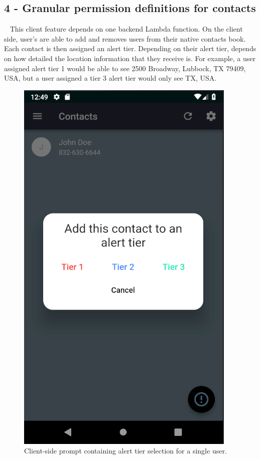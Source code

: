 \documentclass[10pt, a4paper]{article}
\begin{document}
\subsection{4 - Granular permission definitions for contacts}
\par ~ This client feature depends on one backend Lambda function. On the client side, user's are able to add and removes users from their native contacts book. Each contact is then assigned an alert tier. Depending on their alert tier, depends on how detailed the location information that they receive is. For example, a user assigned alert tier 1 would be able to see  2500 Broadway, Lubbock, TX 79409, USA, but a user assigned a tier 3 alert tier would only see TX, USA.

\begin{figure}[H]
  \centerline{
  	\includegraphics[scale=.8]{img/alert-tier.PNG}
  }  
  \caption{Client-side prompt containing alert tier selection for a single user.}
\end{figure}
\end{document}
